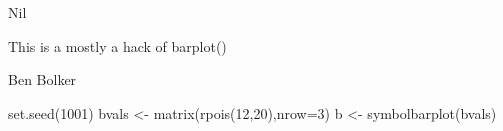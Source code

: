 \begin{Value}
Nil
\end{Value}
\begin{Note}\relax
This is a mostly a hack of barplot()
\end{Note}
\begin{Author}\relax
Ben Bolker
\end{Author}
\begin{Examples}
\begin{ExampleCode}
 set.seed(1001)
 bvals <- matrix(rpois(12,20),nrow=3)
 b <- symbolbarplot(bvals)
\end{ExampleCode}
\end{Examples}

